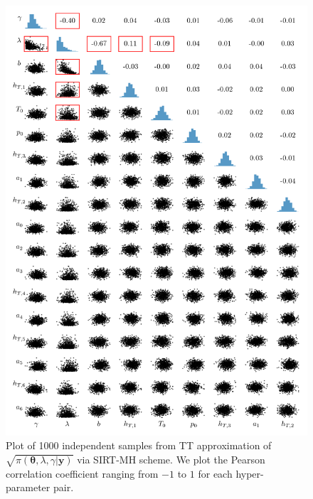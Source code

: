 \begin{figure}[h!]%
	\includegraphics[]{CorrPlot.png}
	\caption[Correlation plot of samples from TT approximation]{Plot of 1000 independent samples from TT approximation of $\sqrt{\pi( \bm{\theta},\lambda,\gamma  | \bm{y})}$ via SIRT-MH scheme. We plot the Pearson correlation coefficient ranging from $-1$ to $1$ for each hyper-parameter pair.}
	\label{fig:CorrPlot}
\end{figure}
